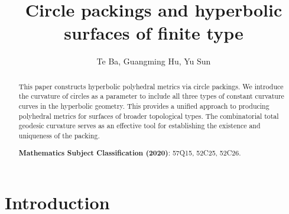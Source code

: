 \documentclass[11pt,leqno]{article}
\title{Circle packings and hyperbolic surfaces of finite type}
\author{Te Ba,  Guangming Hu, Yu Sun}
\date{}
\numberwithin{equation}{section}
\theoremstyle{definition}
\begin{document}
\maketitle

\begin{abstract}
This paper constructs hyperbolic polyhedral metrics via circle packings. We introduce the curvature of circles as a parameter to include all three types of constant curvature curves in the hyperbolic geometry. This provides a unified approach to producing polyhedral metrics for surfaces of broader topological types. The combinatorial total geodesic curvature serves as an effective tool for establishing the existence and uniqueness of the packing.



 \medskip
\noindent\textbf{Mathematics Subject Classification (2020)}: 57Q15, 52C25, 52C26.
\end{abstract}

\section{Introduction}
\end{document}
